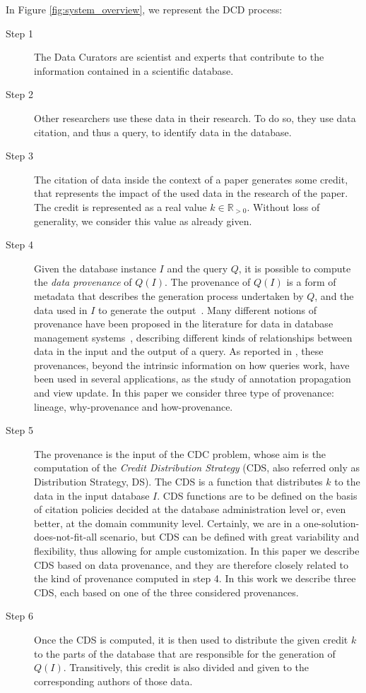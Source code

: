 In Figure \ref{fig:system_overview}, we represent the DCD process:
\begin{description}
	\item[Step 1] The Data Curators are scientist and experts that contribute to the information contained in a scientific database. 
	\item[Step 2] Other researchers use these data in their research. To do so, they use data citation, and thus a query, to identify data in the database.
	\item[Step 3] The citation of data inside the context of a paper generates some credit, that represents the impact of the used data in the research of the paper. The credit is represented as a real value $k \in \mathbb{R}_{>0}$. Without loss of generality, we consider this value as already given.
	\item[Step 4] Given the database instance $I$ and the query $Q$, it is possible to compute the \emph{data provenance} of $Q(I)$. The provenance of $Q(I)$ is a form of metadata that describes the generation process undertaken by $Q$, and the data used in $I$ to generate the output~\citep{CheneyProvSurvey}. Many different notions of provenance have been proposed in the literature for data in database management systems~\citep{lineageCui, WhyProvBuneman, howProvenanceGreen, dosso2020prov}, describing different kinds of relationships between data in the input and the output of a query. As reported in \citep{CheneyProvSurvey}, these provenances, beyond the intrinsic information on how queries work, have been used in several applications, as the study of annotation propagation and view update. In this paper we consider three type of provenance: lineage, why-provenance and how-provenance.
	\item[Step 5] The provenance is the input of the CDC problem, whose aim is the computation of the \emph{Credit Distribution Strategy} (CDS, also referred only as Distribution Strategy, DS). The CDS is a function that distributes $k$ to the data in the input database $I$. 
	CDS functions are to be defined on the basis of citation policies decided at the database administration level or, even better, at the domain community level. 
	Certainly, we are in a one-solution-does-not-fit-all scenario, but CDS can be defined with great variability and flexibility, thus allowing for ample customization. 
	In this paper we describe CDS based on data provenance, and they are therefore closely related to the kind of provenance computed in step 4. In this work we describe three CDS, each based on one of the three considered provenances.
	\item[Step 6] Once the CDS is computed, it is then used to distribute the given credit $k$ to the parts of the database that are responsible for the generation of $Q(I)$. Transitively, this credit is also divided and given to the corresponding authors of those data.
\end{description}

